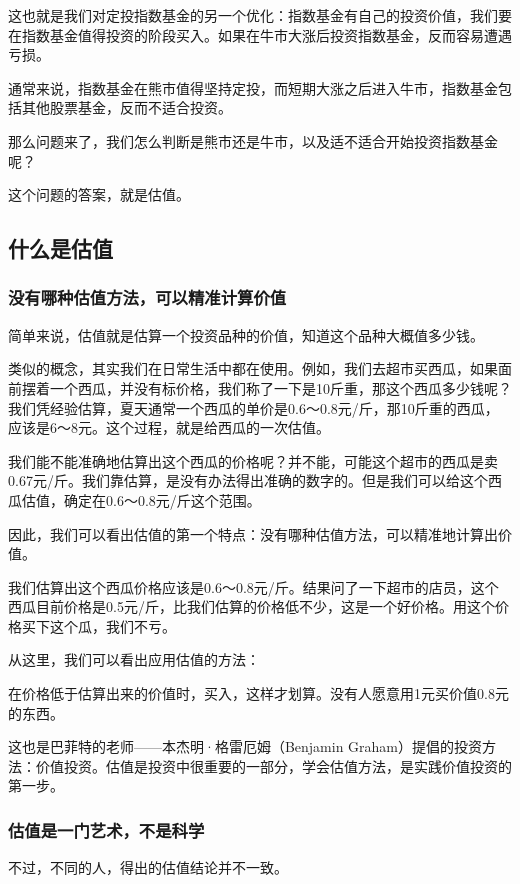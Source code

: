 这也就是我们对定投指数基金的另一个优化：指数基金有自己的投资价值，我们要在指数基金值得投资的阶段买入。如果在牛市大涨后投资指数基金，反而容易遭遇亏损。

通常来说，指数基金在熊市值得坚持定投，而短期大涨之后进入牛市，指数基金包括其他股票基金，反而不适合投资。

那么问题来了，我们怎么判断是熊市还是牛市，以及适不适合开始投资指数基金呢？

这个问题的答案，就是估值。

\subsection{什么是估值}
\subsubsection{没有哪种估值方法，可以精准计算价值}

简单来说，估值就是估算一个投资品种的价值，知道这个品种大概值多少钱。

类似的概念，其实我们在日常生活中都在使用。例如，我们去超市买西瓜，如果面前摆着一个西瓜，并没有标价格，我们称了一下是10斤重，那这个西瓜多少钱呢？我们凭经验估算，夏天通常一个西瓜的单价是0.6～0.8元/斤，那10斤重的西瓜，应该是6～8元。这个过程，就是给西瓜的一次估值。

我们能不能准确地估算出这个西瓜的价格呢？并不能，可能这个超市的西瓜是卖0.67元/斤。我们靠估算，是没有办法得出准确的数字的。但是我们可以给这个西瓜估值，确定在0.6～0.8元/斤这个范围。

因此，我们可以看出估值的第一个特点：没有哪种估值方法，可以精准地计算出价值。

我们估算出这个西瓜价格应该是0.6～0.8元/斤。结果问了一下超市的店员，这个西瓜目前价格是0.5元/斤，比我们估算的价格低不少，这是一个好价格。用这个价格买下这个瓜，我们不亏。

从这里，我们可以看出应用估值的方法：

在价格低于估算出来的价值时，买入，这样才划算。没有人愿意用1元买价值0.8元的东西。

这也是巴菲特的老师——本杰明·格雷厄姆（Benjamin Graham）提倡的投资方法：价值投资。估值是投资中很重要的一部分，学会估值方法，是实践价值投资的第一步。

\subsubsection{估值是一门艺术，不是科学}

不过，不同的人，得出的估值结论并不一致。

